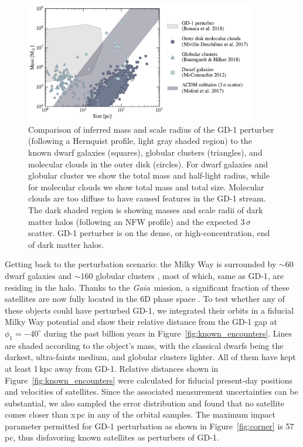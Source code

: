 \documentclass[twocolumn]{aastex62}
\newcommand{\gaia}{\textsl{Gaia}}
\begin{document}
\begin{figure}
\begin{center}
\includegraphics[width=0.9\textwidth]{mass_size.pdf}
\end{center}
\caption{Comparison of inferred mass and scale radius of the GD-1 perturber (following a Hernquist profile, light gray shaded region) to the known dwarf galaxies (squares), globular clusters (triangles), and molecular clouds in the outer disk (circles).
For dwarf galaxies and globular cluster we show the total mass and half-light radius, while for molecular clouds we show total mass and total size.
Molecular clouds are too diffuse to have caused features in the GD-1 stream.
The dark shaded region is showing masses and scale radii of dark matter halos (following an NFW profile) and the expected $3\,\sigma$ scatter.
GD-1 perturber is on the dense, or high-concentration, end of dark matter halos.
}
\label{fig:mass_size}
\end{figure}

Getting back to the perturbation scenario: the Milky Way is surrounded by $\sim60$ dwarf galaxies \citep{mcconnachie2012} and $\sim160$ globular clusters \citep{harris2010}, most of which, same as GD-1, are residing in the halo.
Thanks to the \gaia\ mission, a significant fraction of these satellites are now fully located in the 6D phase space \citep{simon2018, gdr2_satellites}.
To test whether any of these objects could have perturbed GD-1, we integrated their orbits in a fiducial Milky Way potential \citep{pw2017} and show their relative distance from the GD-1 gap at $\phi_1=-40^\circ$ during the past billion years in Figure~\ref{fig:known_encounters}.
Lines are shaded according to the object's mass, with the classical dwarfs being the darkest, ultra-faints medium, and globular clusters lighter.
All of them have kept at least 1\,kpc away from GD-1.
Relative distances shown in Figure~\ref{fig:known_encounters} were calculated for fiducial present-day positions and velocities of satellites.
Since the associated measurement uncertainties can be substantial, we also sampled the error distribution and found that no satellite comes closer than x\,pc in any of the orbital samples.
The maximum impact parameter permitted for GD-1 perturbation as shown in Figure~\ref{fig:corner} is 57\,pc, thus disfavoring known satellites as perturbers of GD-1.
\end{document}
